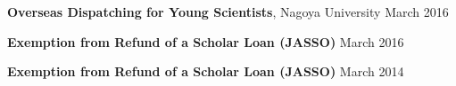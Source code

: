 \cvsimpleentry
  {\textbf{Overseas Dispatching for Young Scientists}, Nagoya University}
  {March 2016}
  {}

\cvsimpleentry
  {\textbf{Exemption from Refund of a Scholar Loan (JASSO)}}
  {March 2016}
  {}

\cvsimpleentry
  {\textbf{Exemption from Refund of a Scholar Loan (JASSO)}}
  {March 2014}
  {}